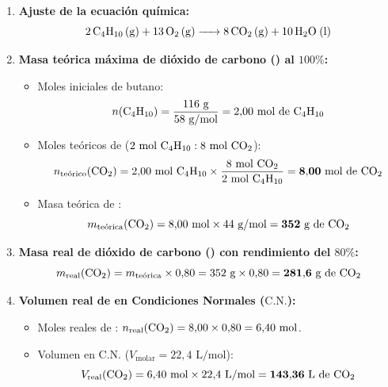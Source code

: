 ﻿\documentclass[11pt,a4paper]{article}
\begin{document}
\vspace{0.2cm}
\begin{enumerate}[label=\textbf{\alph*)}, leftmargin=2em, itemsep=8pt]
    \item \textbf{Ajuste de la ecuación química:}
    \[
    \ce{2 C4H10 (g) + 13 O2 (g) -> 8 CO2 (g) + 10 H2O (l)}
    \]

    \item \textbf{Masa teórica máxima de dióxido de carbono () al $100\%$:}
    \begin{itemize}[leftmargin=1.5em, itemsep=2pt]
        \item Moles iniciales de butano:
        \[
        n(\ce{C4H10}) = \frac{116\text{ g}}{58\text{ g/mol}} = 2{,}00\text{ mol de \ce{C4H10}}
        \]
        \item Moles teóricos de  ($2\text{ mol \ce{C4H10}} : 8\text{ mol \ce{CO2}}$):
        \[
        n_{\text{teórico}}(\ce{CO2}) = 2{,}00\text{ mol \ce{C4H10}} \times \frac{8\text{ mol \ce{CO2}}}{2\text{ mol \ce{C4H10}}} = \mathbf{8{,}00\text{ mol de \ce{CO2}}}
        \]
        \item Masa teórica de :
        \[
        m_{\text{teórica}}(\ce{CO2}) = 8{,}00\text{ mol} \times 44\text{ g/mol} = \mathbf{352\text{ g de \ce{CO2}}}
        \]
    \end{itemize}

    \item \textbf{Masa real de dióxido de carbono () con rendimiento del $80\%$:}
    \[
    m_{\text{real}}(\ce{CO2}) = m_{\text{teórica}} \times 0{,}80 = 352\text{ g} \times 0{,}80 = \mathbf{281{,}6\text{ g de \ce{CO2}}}
    \]

    \item \textbf{Volumen real de  en Condiciones Normales ($\text{C.N.}$):}
    \begin{itemize}[leftmargin=1.5em, itemsep=2pt]
        \item Moles reales de : $n_{\text{real}}(\ce{CO2}) = 8{,}00 \times 0{,}80 = 6{,}40\text{ mol}$.
        \item Volumen en C.N. ($V_{\text{molar}} = 22{,}4\text{ L/mol}$):
        \[
        V_{\text{real}}(\ce{CO2}) = 6{,}40\text{ mol} \times 22{,}4\text{ L/mol} = \mathbf{143{,}36\text{ L de \ce{CO2}}}
        \]
    \end{itemize}
\end{enumerate}
\end{document}
